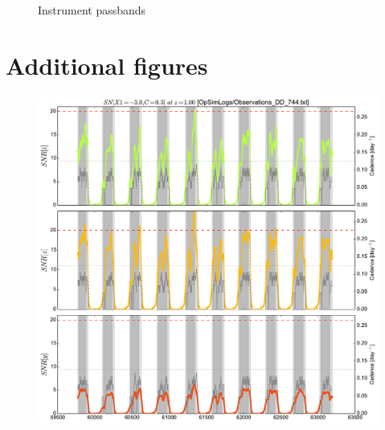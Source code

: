 \documentclass[\docopts]{\docclass}
\begin{document}
\begin{figure}[t]
\begin{center}
\caption{Instrument passbands}
\label{fig:throughput_comparison}
\end{center}
\end{figure}



\section{Additional figures}

\begin{figure}[t]
  \begin{center}
    \includegraphics[width=\linewidth]{metric_DD_744.pdf}
    \caption{}
  \end{center}
\end{figure}
\end{document}
